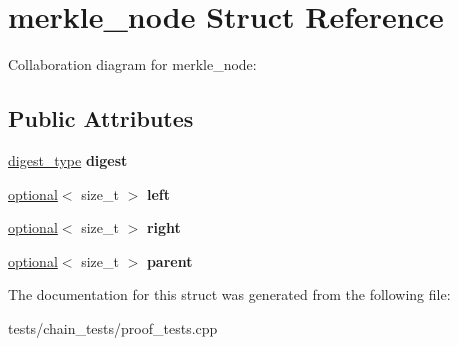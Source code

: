 \hypertarget{structmerkle__node}{}\section{merkle\+\_\+node Struct Reference}
\label{structmerkle__node}


Collaboration diagram for merkle\+\_\+node\+:
\subsection*{Public Attributes}
\begin{DoxyCompactItemize}
\item 
\mbox{\label{structmerkle__node_ae10173ef92466b11fe251af72e452aba}} 
\mbox{\hyperlink{classfc_1_1sha256}{digest\+\_\+type}} {\bfseries digest}
\item 
\mbox{\label{structmerkle__node_aea22900f82e184c975e3da3d7c86a63e}} 
\mbox{\hyperlink{classaacio_1_1optional}{optional}}$<$ size\+\_\+t $>$ {\bfseries left}
\item 
\mbox{\label{structmerkle__node_a8646e444e25489d1fb845f9b61766c62}} 
\mbox{\hyperlink{classaacio_1_1optional}{optional}}$<$ size\+\_\+t $>$ {\bfseries right}
\item 
\mbox{\label{structmerkle__node_acfbc085eb9c324b1937ac07b1d822dd6}} 
\mbox{\hyperlink{classaacio_1_1optional}{optional}}$<$ size\+\_\+t $>$ {\bfseries parent}
\end{DoxyCompactItemize}


The documentation for this struct was generated from the following file\+:\begin{DoxyCompactItemize}
\item 
tests/chain\+\_\+tests/proof\+\_\+tests.\+cpp\end{DoxyCompactItemize}

